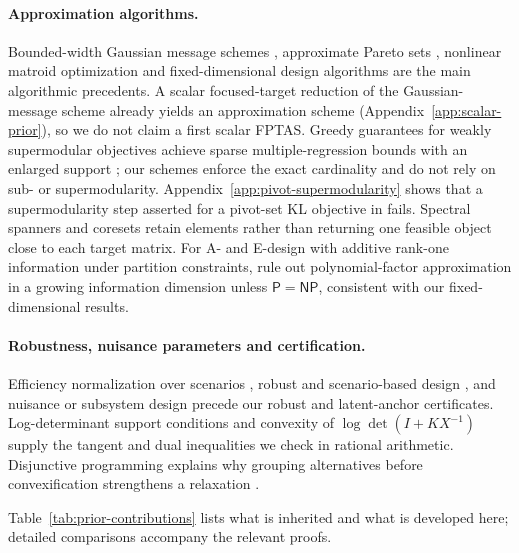 \paragraph{Approximation algorithms.}
Bounded-width Gaussian message schemes \citep{Mahalanabis2012}, approximate
Pareto sets \citep{Papadimitriou2000,Tsaggouris2009,Mittal2013}, nonlinear
matroid optimization \citep{Berstein2008} and fixed-dimensional design
algorithms \citep{Brown2024} are the main algorithmic precedents. A scalar
focused-target reduction of the Gaussian-message scheme already yields an
approximation scheme (Appendix~\ref{app:scalar-prior}), so we do not claim a
first scalar FPTAS. Greedy guarantees for weakly supermodular objectives
achieve sparse multiple-regression bounds with an enlarged support
\citep{Liberty2017}; our schemes enforce the exact cardinality and do not
rely on sub- or supermodularity. Appendix~\ref{app:pivot-supermodularity}
shows that a supermodularity step asserted for a pivot-set KL objective in
\citet{KaminetzThesis2025} fails. Spectral spanners and coresets
\citep{Indyk2020,Mahabadi2026} retain elements rather than returning one
feasible object close to each target matrix. For A- and E-design with
additive rank-one information under partition constraints,
\citet{BansalXu2026} rule out polynomial-factor approximation in a growing
information dimension unless $\mathsf{P}=\mathsf{NP}$, consistent with our
fixed-dimensional results.

\paragraph{Robustness, nuisance parameters and certification.}
Efficiency normalization over scenarios \citep{Burclova2016,Maus2010},
robust and scenario-based design
\citep{Duarte2018,WangYue2026,Chowdhary2025}, and nuisance or subsystem
design \citep{Alexanderian2021,Sagnol2015,LevineHow2013}
precede our robust and latent-anchor certificates. Log-determinant support
conditions \citep{HarmanTrnovska2009} and convexity of
$\log\det(I+KX^{-1})$ \citep{KimKim2006,Kim2019} supply the tangent and dual
inequalities we check in rational arithmetic. Disjunctive programming
explains why grouping alternatives before convexification strengthens a
relaxation \citep{Balas1985,Papageorgiou2025}.

Table~\ref{tab:prior-contributions} lists what is inherited and what is
developed here; detailed comparisons accompany the relevant proofs.

